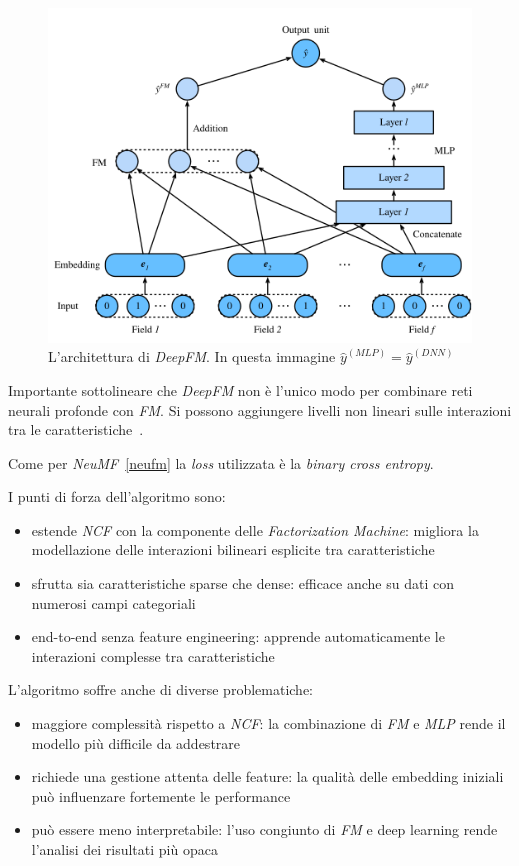 \begin{figure}[H]
    \centering
    \includegraphics[scale=0.5]{figures/algorithms/deepfm.png}
    \caption{L'architettura di \textit{DeepFM}. In questa immagine $\hat{y}^{(MLP)} = \hat{y}^{(DNN)}$}
    \label{fig:deepfm}
\end{figure}

Importante sottolineare che \textit{DeepFM} non è l'unico modo per combinare reti neurali profonde con \textit{FM}. Si possono aggiungere livelli non lineari sulle interazioni tra le caratteristiche~\cite{NFA_SPA}.

Come per \textit{NeuMF}~\ref{neufm} la \textit{loss} utilizzata è la \textit{binary cross entropy}.

I punti di forza dell'algoritmo sono:

\begin{itemize}
  \item estende \textit{NCF} con la componente delle \textit{Factorization Machine}: migliora la modellazione delle interazioni bilineari esplicite tra caratteristiche
  \item sfrutta sia caratteristiche sparse che dense: efficace anche su dati con numerosi campi categoriali
  \item end-to-end senza feature engineering: apprende automaticamente le interazioni complesse tra caratteristiche
\end{itemize}

L'algoritmo soffre anche di diverse problematiche:

\begin{itemize}
  \item maggiore complessità rispetto a \textit{NCF}: la combinazione di \textit{FM} e \textit{MLP} rende il modello più difficile da addestrare
  \item richiede una gestione attenta delle feature: la qualità delle embedding iniziali può influenzare fortemente le performance
  \item può essere meno interpretabile: l'uso congiunto di \textit{FM} e deep learning rende l'analisi dei risultati più opaca
\end{itemize}

